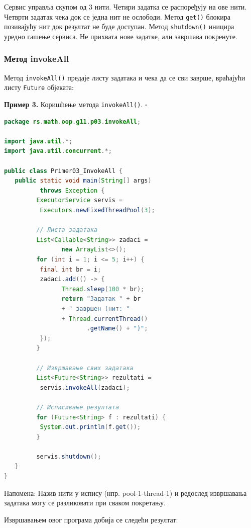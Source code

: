Сервис управља скупом од 3 нити. Четири задатка се распоређују на ове нити. Четврти задатак чека док се једна нит не ослободи. Метод \texttt{get()} блокира позивајућу нит док резултат не буде доступан. Метод \texttt{shutdown()} иницира уредно гашење сервиса. Не прихвата нове задатке, али завршава покренуте.


\subsubsection{Метод invokeAll}

Метод \texttt{invokeAll()} предаје листу задатака и чека да се сви заврше, враћајући листу \texttt{Future} објеката:


\bigskip

\noindent \textbf{Пример 3.} Коришћење метода \texttt{invokeAll()}. $\square$

\medskip


\begin{lstlisting}[language=Java]
package rs.math.oop.g11.p03.invokeAll;
 
import java.util.*;
import java.util.concurrent.*;
 
public class Primer03_InvokeAll {
   public static void main(String[] args)
          throws Exception {
         ExecutorService servis =
          Executors.newFixedThreadPool(3);
 
         // Листа задатака
         List<Callable<String>> zadaci =
                new ArrayList<>();
         for (int i = 1; i <= 5; i++) {
          final int br = i;
          zadaci.add(() -> {
                Thread.sleep(100 * br);
                return "Задатак " + br
                + " завршен (нит: "
                + Thread.currentThread()
                       .getName() + ")";
          });
         }
 
         // Извршавање свих задатака
         List<Future<String>> rezultati =
          servis.invokeAll(zadaci);
 
         // Исписивање резултата
         for (Future<String> f : rezultati) {
          System.out.println(f.get());
         }
 
         servis.shutdown();
   }
}
\end{lstlisting}


Напомена:\textbf{ }Назив нити у испису (нпр. pool-1-thread-1) и редослед извршавања задатака могу се разликовати при сваком покретању.

Извршавањем овог програма добија се следећи резултат:


